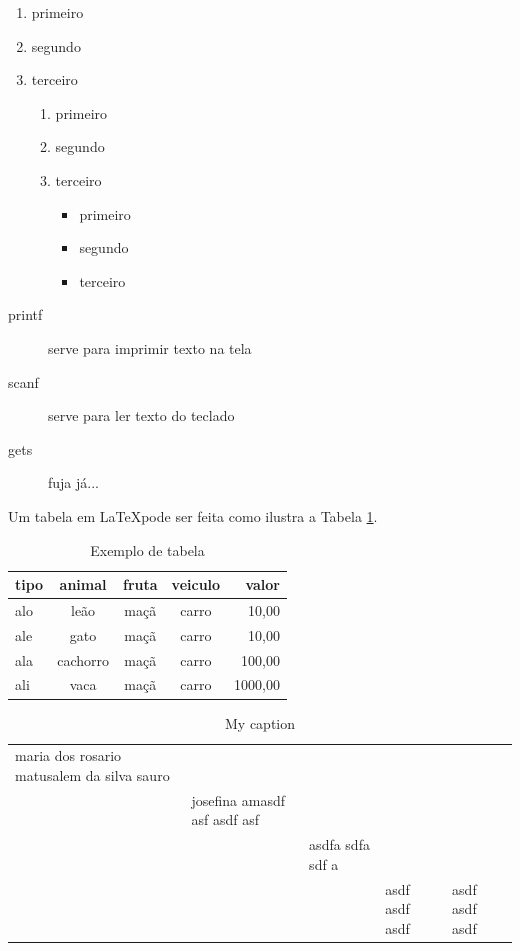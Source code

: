 \documentclass[a4, 12pt]{report}
\begin{document}
\begin{enumerate}
\item primeiro
\item segundo
\item terceiro
  \begin{enumerate}
  \item primeiro
  \item segundo
  \item terceiro
    \begin{itemize}
    \item primeiro
    \item segundo
    \item terceiro
    \end{itemize}
  \end{enumerate}
\end{enumerate}

\begin{description}
\item[printf] serve para imprimir texto na tela
\item[scanf] serve para ler texto do teclado
\item[gets] fuja já...
\end{description}

Um tabela em \LaTeX pode ser feita como ilustra a Tabela
\ref{tab:exemplo}.

\begin{table}[htb]
  \centering
  \begin{tabular}[htb]{|l|c|c|c|r|}\hline
  tipo & animal &  fruta & veiculo & valor\\ \hline\hline
  alo & leão & maçã & carro & 10,00\\ \hline
  ale & gato & maçã & carro & 10,00\\ \hline
  ala & cachorro & maçã & carro & 100,00\\ \hline
  ali & vaca & maçã & carro & 1000,00\\ \hline    
  \end{tabular}
  \caption{Exemplo de tabela}
  \label{tab:exemplo}
\end{table}



\begin{table}[]
\centering
\caption{My caption}
\label{my-label}
\begin{tabularx}{\linewidth}{XXXXX}
  maria dos rosario matusalem da silva sauro &                              &                  &                &                \\
                                             & josefina amasdf asf asdf asf &                  &                &                \\
                                             &                              & asdfa sdfa sdf a &                &                \\
                                             &                              &                  & asdf asdf asdf & asdf asdf asdf
\end{tabularx}
\end{table}
\end{document}
